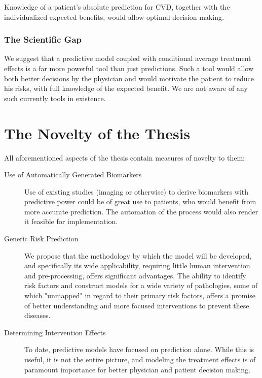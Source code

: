 \documentclass[a4paper,12pt]{article}
\begin{document}
			Knowledge of a patient's absolute prediction for CVD, together with the individualized expected benefits, would allow optimal decision making.
			
			\subsubsection{The Scientific Gap}
			
			We suggest that a predictive model coupled with conditional average treatment effects is a far more powerful tool than just predictions. Such a tool would allow both better decisions by the physician and would motivate the patient to reduce his risks, with full knowledge of the expected benefit. We are not aware of any such currently tools in existence.
			
	\section{The Novelty of the Thesis}
	
	All aforementioned aspects of the thesis contain measures of novelty to them:
	
	\begin{description}
		
		\item[Use of Automatically Generated Biomarkers] Use of existing studies (imaging or otherwise) to derive biomarkers with predictive power could be of great use to patients, who would benefit from more accurate prediction. The automation of the process would also render it feasible for implementation.
		
		\item[Generic Risk Prediction] We propose that the methodology by which the model will be developed, and specifically its wide applicability, requiring little human intervention and pre-processing, offers significant advantages. The ability to identify risk factors and construct models for a wide variety of pathologies, some of which "unmapped" in regard to their primary risk factors, offers a promise of better understanding and more focused interventions to prevent these diseases.
		
		\item[Determining Intervention Effects] To date, predictive models have focused on prediction alone. While this is useful, it is not the entire picture, and modeling the treatment effects is of paramount importance for better physician and patient decision making.
		
	\end{description}
	
\end{document}
